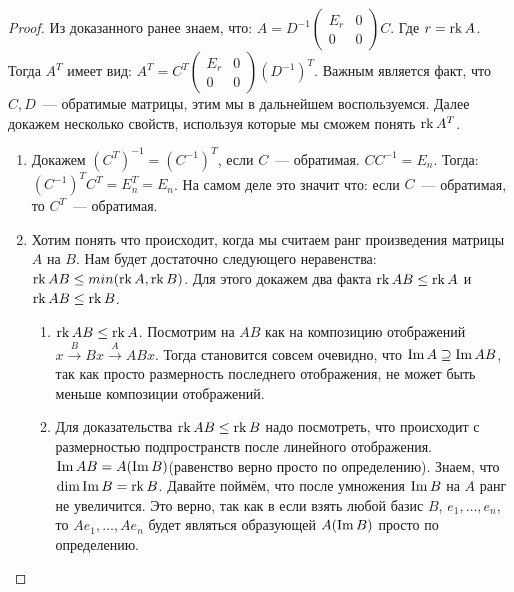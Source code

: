 \begin{proof}\leavevmode
    Из доказанного ранее знаем, что:
    $A = D^{-1}\left(\begin{array}{c|c}
            E_r & 0\\
            \hline
            0 & 0
    \end{array}\right) C$. Где $r = \operatorname{rk} A$. Тогда $A^T$ имеет вид:
    $A^T = C^T \left(\begin{array}{c|c}
            E_r & 0\\
            \hline
            0 & 0
    \end{array}\right)(D^{-1})^T.$ Важным является факт, что $C, D$~---
    обратимые матрицы, этим мы в дальнейшем воспользуемся.
    Далее докажем несколько свойств, используя которые мы сможем понять
    $\operatorname{rk} A^T$.
    \begin{enumerate}
        \item Докажем $(C^T)^{-1} = (C^{-1})^T$, если $C$~--- обратимая.
            $CC^{-1} = E_n$. Тогда: 
            $(C^{-1})^TC^T=E_n^T = E_n$.
            На самом деле это значит что: если $C$~--- обратимая, то
            $C^T$~--- обратимая.
        \item Хотим понять что происходит, когда мы считаем ранг
            произведения матрицы $A$ на $B$.
            Нам будет достаточно следующего неравенства:
            $\operatorname{rk} AB \le min(\operatorname{rk} A, \operatorname{rk} B)$.
            Для этого докажем два факта $\operatorname{rk} AB \le \operatorname{rk} A$ и $\operatorname{rk} AB\le \operatorname{rk} B$.
            \begin{enumerate}
                \item $\operatorname{rk} AB \le \operatorname{rk} A$. 
                    Посмотрим на $AB$ как на композицию отображений $x \xrightarrow{B} Bx \xrightarrow{A} ABx$.
                    Тогда становится совсем очевидно, что $\operatorname{Im} A \supseteq \operatorname{Im} AB$, так как просто размерность
                    последнего отображения, не может быть меньше композиции отображений.
                \item
                    Для доказательства $\operatorname{rk} AB \le \operatorname{rk} B$ надо посмотреть, что происходит с размерностью
                    подпространств после линейного отображения. 
                    $\operatorname{Im} AB = A(\operatorname{Im} B)$(равенство верно просто по определению).
                    Знаем, что $\dim \operatorname{Im} B = \operatorname{rk} B$.
                    Давайте поймём, что после умножения $\operatorname{Im} B$ на $A$ ранг
                    не увеличится. Это верно, так как в если взять любой базис $B$, $e_1,\dots, e_n$,
                    то  $Ae_1, \dots, Ae_n$ будет являться образующей $A(\operatorname{Im} B)$ просто по определению.

\end{enumerate}
\end{enumerate}
\end{proof}

